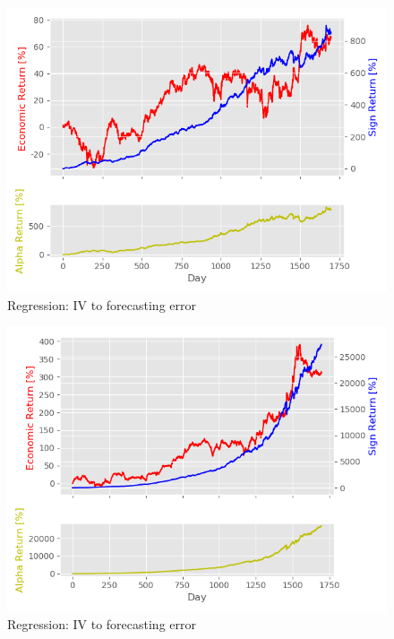 \begin{figure}[h]
    \centering
    \includegraphics[scale = 0.5]{Plot/BucketNumber3ReturnPlot.png}
    \caption{Regression: IV to forecasting error}
    \label{visualization}
\end{figure}

\begin{figure}[h]
    \centering
    \includegraphics[scale = 0.5]{Plot/BucketNumber4ReturnPlot.png}
    \caption{Regression: IV to forecasting error}
    \label{visualization}
\end{figure}